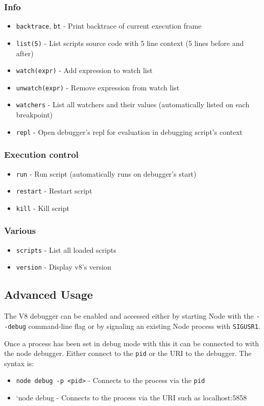 \subsubsection{Info}

\begin{itemize}
\item
  \texttt{backtrace}, \texttt{bt} - Print backtrace of current execution
  frame
\item
  \texttt{list(5)} - List scripts source code with 5 line context (5
  lines before and after)
\item
  \texttt{watch(expr)} - Add expression to watch list
\item
  \texttt{unwatch(expr)} - Remove expression from watch list
\item
  \texttt{watchers} - List all watchers and their values (automatically
  listed on each breakpoint)
\item
  \texttt{repl} - Open debugger's repl for evaluation in debugging
  script's context
\end{itemize}

\subsubsection{Execution control}

\begin{itemize}
\item
  \texttt{run} - Run script (automatically runs on debugger's start)
\item
  \texttt{restart} - Restart script
\item
  \texttt{kill} - Kill script
\end{itemize}

\subsubsection{Various}

\begin{itemize}
\item
  \texttt{scripts} - List all loaded scripts
\item
  \texttt{version} - Display v8's version
\end{itemize}

\subsection{Advanced Usage}

The V8 debugger can be enabled and accessed either by starting Node with
the \texttt{-{}-debug} command-line flag or by signaling an existing
Node process with \texttt{SIGUSR1}.

Once a process has been set in debug mode with this it can be connected
to with the node debugger. Either connect to the \texttt{pid} or the URI
to the debugger. The syntax is:

\begin{itemize}
\item
  \texttt{node debug -p \textless{}pid\textgreater{}} - Connects to the
  process via the \texttt{pid}
\item
  `node debug - Connects to the process via the URI such as
  localhost:5858
\end{itemize}
